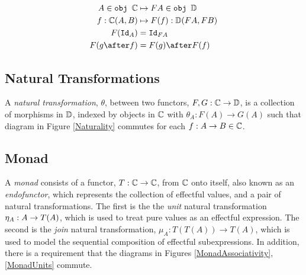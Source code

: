 \begin{align*}
    A\in\obj\C &\mapsto FA \in \obj\DC\\
    f: \C(A, B) &\mapsto F(f): \DC(FA, FB)\\
    F(\Id{A}) & = \Id{FA} \\
    F(g\after f) & = F(g)\after F(f)
\end{align*}

\subsection{Natural Transformations}

A \textit{natural transformation}, $\theta$, between two functors, $F, G: \mathbb{C} \rightarrow \mathbb{D}$, is a collection of morphisms in $\mathbb{D}$, indexed by objects in $\mathbb{C}$ with  $\theta_A: F(A) \rightarrow G(A)$ such that diagram in Figure \ref{Naturality} commutes for each $f: A \rightarrow B \in \mathbb{C}$.



\subsection{Monad}
A \textit{monad} consists of a functor, $T: \mathbb{C} \rightarrow \mathbb{C}$, from $\mathbb{C}$ onto itself, also known as an \textit{endofunctor}, which represents the collection of effectful values, and a pair of natural transformations. The first is the the \textit{unit} natural transformation $\eta_{A}: A\rightarrow T(A)$, which is used to treat pure values as an effectful expression. The second is the \textit{join} natural transformation, $\mu_{A}: T(T(A)) \rightarrow T(A)$,  which is used to model the sequential composition of effectful subexpressions. In addition, there is a requirement that the diagrams in Figures \ref{MonadAssociativity}, \ref{MonadUnits} commute.


